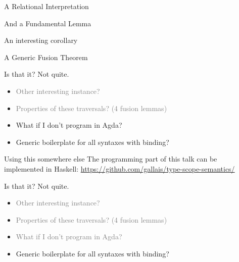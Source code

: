 \documentclass[xetex, mathserif, serif]{beamer}
\begin{document}
  \begin{frame}{A Relational Interpretation}
  \end{frame}

  \begin{frame}{And a Fundamental Lemma}
  \end{frame}

  \begin{frame}{An interesting corollary}
  \end{frame}
  
  \begin{frame}{A Generic Fusion Theorem}
    \vspace{-1.8em}
    \vspace{-1.8em}
    \vspace{-1.8em}
    \unskip
  \end{frame}

  \begin{frame}{Is that it? Not quite.}
    \begin{itemize}
      \item \textcolor{gray}{Other interesting instance?}
      \item \textcolor{gray}{Properties of these traversals? (4 fusion lemmas)}
      \item What if I don't program in Agda?
      \item Generic boilerplate for all syntaxes with binding?
    \end{itemize}
  \end{frame}

  \begin{frame}{Using this somewhere else}
    The programming part of this talk can be implemented in Haskell:
    {\small\url{https://github.com/gallais/type-scope-semantics/}}
  \end{frame}

  \begin{frame}{Is that it? Not quite.}
    \begin{itemize}
      \item \textcolor{gray}{Other interesting instance?}
      \item \textcolor{gray}{Properties of these traversals? (4 fusion lemmas)}
      \item \textcolor{gray}{What if I don't program in Agda?}
      \item Generic boilerplate for all syntaxes with binding?
    \end{itemize}
  \end{frame}
\end{document}
